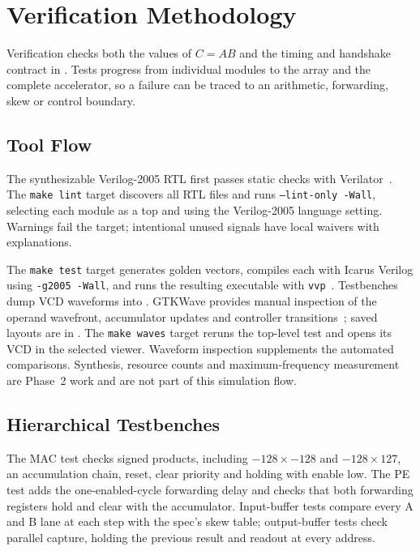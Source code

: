 
\section{Verification Methodology}
Verification checks both the values of $C=AB$ and the timing and handshake
contract in . Tests progress from individual modules to
the array and the complete accelerator, so a failure can be traced to an
arithmetic, forwarding, skew or control boundary.

\subsection{Tool Flow}
The synthesizable Verilog-2005 RTL first passes static checks with
Verilator~\cite{verilator2026guide}. The \texttt{make lint} target discovers all
RTL files and runs \texttt{--lint-only -Wall}, selecting each module as a
top and using the Verilog-2005 language setting. Warnings fail the target;
intentional unused signals have local waivers with explanations.

The \texttt{make test} target generates golden vectors, compiles each
 with Icarus Verilog using \texttt{-g2005 -Wall}, and runs
the resulting executable with \texttt{vvp}~\cite{icarus2026simulation}.
Testbenches dump VCD waveforms into . GTKWave provides manual
inspection of the operand wavefront, accumulator updates and controller
transitions~\cite{gtkwave2026docs}; saved layouts are in .
The \texttt{make waves} target reruns the top-level test and opens its VCD
in the selected viewer. Waveform inspection supplements the automated
comparisons. Synthesis, resource counts and maximum-frequency measurement
are Phase~2 work and are not part of this simulation flow.

\subsection{Hierarchical Testbenches}
The MAC test checks signed products, including $-128\times-128$ and
$-128\times127$, an accumulation chain, reset, clear priority and holding
with enable low. The PE test adds the one-enabled-cycle forwarding delay
and checks that both forwarding registers hold and clear with the
accumulator. Input-buffer tests compare every A and B lane at each step
with the spec's skew table; output-buffer tests check parallel capture,
holding the previous result and readout at every address.

